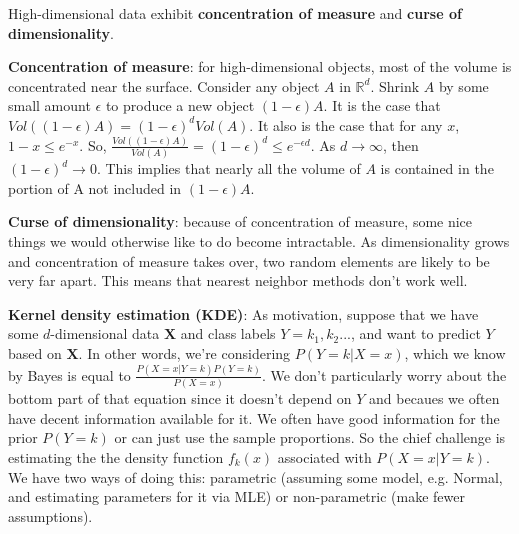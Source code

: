 \documentclass{article}
\begin{document}
High-dimensional data exhibit \textbf{concentration of measure} and
\textbf{curse of dimensionality}.

\medskip

\textbf{Concentration of measure}: for high-dimensional objects, most of the volume is concentrated near the
surface. Consider any object $A$ in $\mathbb{R}^d$. Shrink $A$ by some small
amount $\epsilon$ to produce a new object $(1-\epsilon)A$. It is the case that
$Vol((1-\epsilon)A) = (1-\epsilon)^d Vol(A)$. It also is the case that for any
$x$, $1-x \leq e^{-x}$. So, $\frac{Vol((1-\epsilon)A)}{Vol(A)} = (1-\epsilon)^d
\leq e^{-\epsilon d}$. As $d \to \infty$, then $(1-\epsilon)^d \to 0$. This
implies that nearly all the volume of $A$ is contained in the portion of A not
included in $(1-\epsilon)A$.


\medskip

\textbf{Curse of dimensionality}: because of concentration of measure, some nice
things we would otherwise like to do become intractable. As dimensionality grows
and concentration of measure takes over, two random elements are likely to be
very far apart. This means that nearest neighbor methods don't work well.

\medskip

\textbf{Kernel density estimation (KDE)}: As motivation, suppose that we have some $d$-dimensional data
$\mathbf{X}$ and class labels $Y=k_1, k_2...$, and want to predict $Y$ based on
$\mathbf{X}$. In other words, we're considering $P(Y=k|X=x)$, which we know by
Bayes is equal to $\frac{P(X=x|Y=k)P(Y=k)}{P(X=x)}$. We don't particularly worry
about the bottom part of that equation since it doesn't depend on $Y$ and
becaues we often have decent information available for it. We often
have good information for the prior $P(Y=k)$ or can just use the sample
proportions. So the chief challenge is estimating the the density function
$f_k(x)$ associated with $P(X=x|Y=k)$. We have two ways of doing this:
parametric (assuming some model, e.g. Normal, and estimating parameters for it
via MLE) or non-parametric (make fewer assumptions).
\end{document}
